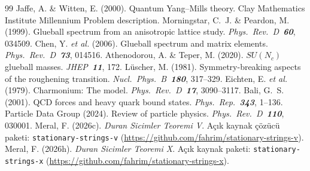 \documentclass[12pt,a4paper]{article}
\begin{document}
\begin{thebibliography}{99}
     Jaffe, A. \& Witten, E. (2000). Quantum Yang--Mills theory.
    Clay Mathematics Institute Millennium Problem description.
     Morningstar, C.~J. \& Peardon, M. (1999). Glueball spectrum
    from an anisotropic lattice study. \textit{Phys.\ Rev.\ D\ \textbf{60}}, 034509.
     Chen, Y. \textit{et al.} (2006). Glueball spectrum and matrix
    elements. \textit{Phys.\ Rev.\ D\ \textbf{73}}, 014516.
     Athenodorou, A. \& Teper, M. (2020). $SU(N_c)$ glueball masses.
    \textit{JHEP\ \textbf{11}}, 172.
     L\"uscher, M. (1981). Symmetry-breaking aspects of the roughening
    transition. \textit{Nucl.\ Phys.\ B\ \textbf{180}}, 317--329.
     Eichten, E. \textit{et al.} (1979). Charmonium: The model.
    \textit{Phys.\ Rev.\ D\ \textbf{17}}, 3090--3117.
     Bali, G.~S. (2001). QCD forces and heavy quark bound states.
    \textit{Phys.\ Rep.\ \textbf{343}}, 1--136.
     Particle Data Group (2024). Review of particle physics.
    \textit{Phys.\ Rev.\ D\ \textbf{110}}, 030001.
     Meral, F. (2026c). \textit{Duran Sicimler Teoremi V}.
    Açık kaynak çözücü paketi: \texttt{stationary-strings-v}
    (\url{https://github.com/fahrim/stationary-strings-v}).
     Meral, F. (2026h). \textit{Duran Sicimler Teoremi X}.
    Açık kaynak paketi: \texttt{stationary-strings-x}
    (\url{https://github.com/fahrim/stationary-strings-x}).
\end{thebibliography}
\end{document}
